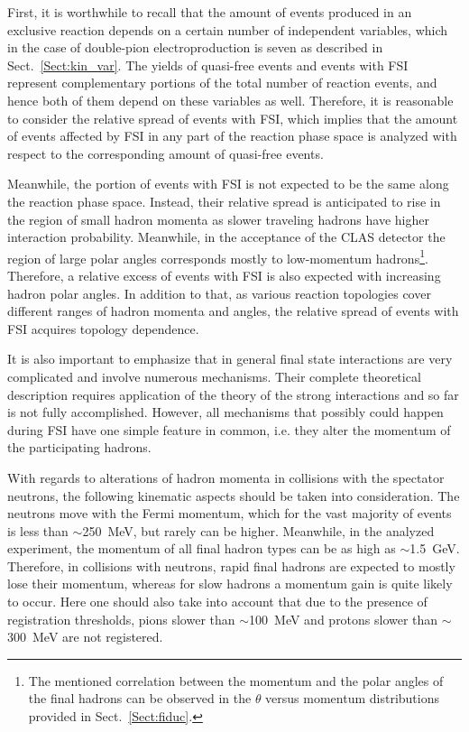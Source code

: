 First, it is worthwhile to recall that the amount of events produced in an exclusive reaction depends on a certain number of independent variables, which in the case of double-pion electroproduction is seven as described in Sect.~\ref{Sect:kin_var}. The yields of quasi-free events and events with FSI represent complementary portions of the total number of reaction events, and hence both of them depend on these variables as well. Therefore, it is reasonable to consider the relative spread of events with FSI, which implies that the amount of events affected by FSI in any part of the reaction phase space is analyzed with respect to the corresponding amount of quasi-free events.


Meanwhile, the portion of events with FSI is not expected to be the same along the reaction phase space. Instead, their relative spread is anticipated to rise in the region of small hadron momenta as slower traveling hadrons have higher interaction probability. Meanwhile, in the acceptance of the CLAS detector the region of large polar angles corresponds mostly to low-momentum hadrons\footnote[4]{The mentioned correlation between the momentum and the polar angles of the final hadrons can be observed in the $\theta$ versus momentum distributions provided in Sect.~\ref{Sect:fiduc}. }. Therefore, a relative excess of events with FSI is also expected with increasing hadron polar angles. In addition to that, as various reaction topologies cover different ranges of hadron momenta and angles, the relative spread of events with FSI acquires topology dependence. 

It is also important to emphasize that in general final state interactions are very complicated and involve numerous mechanisms. Their complete theoretical description requires application of the theory of the strong interactions and so far is not fully accomplished. However, all mechanisms that possibly could happen during FSI have one simple feature in common, i.e. they alter the momentum of the participating hadrons.


With regards to alterations of hadron momenta in collisions with the spectator neutrons, the following kinematic aspects should be taken into consideration. The neutrons move with the Fermi momentum, which for the vast majority of events is less than $\sim$250~MeV, but rarely can be higher. Meanwhile, in the analyzed experiment, the momentum of all final hadron types can be as high as $\sim$1.5~GeV. Therefore, in collisions with neutrons, rapid final hadrons are expected to mostly lose their momentum, whereas for slow hadrons a momentum gain is quite likely to occur. Here one should also take into account that due to the presence of registration thresholds, pions slower than $\sim$100~MeV and protons slower than $\sim$300~MeV are not registered.


